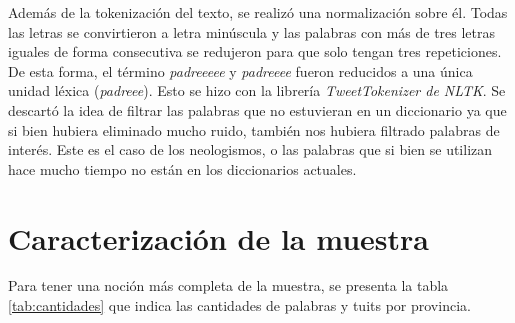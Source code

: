 Además de la tokenización del texto, se realizó una normalización sobre él. Todas las letras se convirtieron a letra minúscula y las palabras con más de tres letras iguales de forma consecutiva se redujeron para que solo tengan tres repeticiones. De esta forma, el término \textit{padreeeee} y \textit{padreeee} fueron reducidos a una única unidad léxica (\textit{padreee}). Esto se hizo con la librería \textit{TweetTokenizer de NLTK}. 
Se descartó la idea de filtrar las palabras que no estuvieran en un diccionario ya que si bien hubiera eliminado mucho ruido, también nos hubiera filtrado palabras de interés. Este es el caso de los neologismos, o las palabras que si bien se utilizan hace mucho tiempo no están en los diccionarios actuales.

\section{Caracterización de la muestra}

Para tener una noción más completa de la muestra, se presenta la tabla \ref{tab:cantidades} que indica las cantidades de palabras y tuits por provincia.



